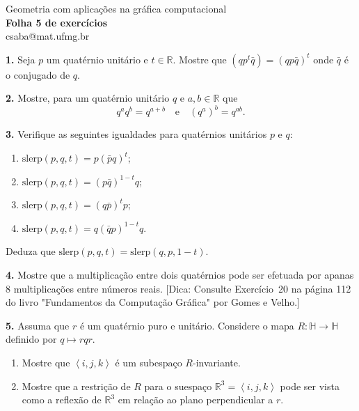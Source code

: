 \documentclass{amsart}
\newcommand{\R}{\mathbb R}
\begin{document}
\begin{center}
\large Geometria com aplicações na gráfica computacional\\
{\bf\large Folha 5 de exercícios}\\
csaba@mat.ufmg.br
\end{center}


\bigskip

{\bf 1.} Seja $p$ um quatérnio unitário e $t\in\R$. Mostre que $(qp^t\bar q)=(qp\bar q)^t$ onde $\bar q$ é 
o conjugado de $q$. 

\medskip

{\bf 2.} Mostre, para um quatérnio unitário $q$ e $a,b\in\R$ que 
\[
    q^aq^b=q^{a+b}\quad\mbox{e}\quad (q^a)^b=q^{ab}.
\]
\medskip

{\bf 3.} Verifique as seguintes igualdades para quatérnios unitários $p$ e $q$:
\begin{enumerate}
    \item $\mbox{slerp}(p,q,t)=p(\bar pq)^t$;
    \item $\mbox{slerp}(p,q,t)=(p\bar q)^{1-t}q$;
    \item $\mbox{slerp}(p,q,t)=(q\bar p)^{t}p$;
    \item $\mbox{slerp}(p,q,t)=q(\bar qp)^{1-t}q$.
\end{enumerate}
Deduza que $\mbox{slerp}(p,q,t)=\mbox{slerp}(q,p,1-t)$. 

\medskip


{\bf 4.} Mostre que a multiplicação entre dois quatérnios pode ser efetuada por apanas 8 multiplicações
entre números reais. [Dica: Consulte Exercício~20 na página 112 do livro "Fundamentos da Computação Gráfica" por Gomes e Velho.]

\medskip

{\bf 5.} Assuma que $r$ é um quatérnio puro e unitário. Considere o mapa $R:\mathbb H\to\mathbb H$
definido por $q\mapsto rqr$. 
\begin{enumerate}
    \item Mostre que $\left<i,j,k\right>$ é um subespaço $R$-invariante.
    \item Mostre que a restrição de $R$ para o suespaço $\R^3=\left<i,j,k\right>$
    pode ser vista como a reflexão de $\R^3$ em relação ao plano perpendicular a $r$. 
\end{enumerate}


\medskip
\end{document}
